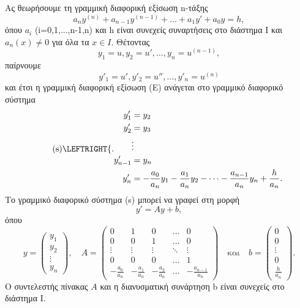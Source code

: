 \documentclass[11pt,a4paper,twoside]{book}
\begin{document}
\medskip
Ας θεωρήσουμε τη γραμμική διαφορική εξίσωση n-τάξης
\begin{equation} \tag{E}
a_n y^{(n)} + a_{n-1} y^{(n-1)} + \dots + a_1 y' + a_0 y = h,
\end{equation}
όπου $a_i$ (i=0,1,...,n-1,n) και h είναι συνεχείς συναρτήσεις στο διάστημα Ι και $a_n(x) \ne 0$ για όλα τα $x \in I$. Θέτοντας
\[
y_1=u, y_2=u', \dots, y_n=u^{(n-1)},
\]
παίρνουμε
\[
y'_1=u', y'_2=u'', \dots, y'_n=u^{(n)}
\]
και έτσι η γραμμική διαφορική εξίσωση (Ε) ανάγεται στο γραμμικό διαφορικό σύστημα
\begin{equation} \tag{s}
\LEFTRIGHT\{.{
\begin{aligned}
    y'_1 &= y_2 \\
    y'_2 &= y_3 \\
    &\vdots \\
    y'_{n-1} &= y_n \\
    y'_n &= -\frac{a_0}{a_n}y_1 - \frac{a_1}{a_n}y_2 - \dots - \frac{a_{n-1}}{a_n}y_n + \frac{h}{a_n}.
\end{aligned}}
\end{equation}
Το γραμμικό διαφορικό σύστημα (s) μπορεί να γραφεί στη μορφή
\begin{equation} \tag{s}
y' = Ay+b,
\end{equation}
όπου
\[
y = \begin{pmatrix} y_1 \\ y_2 \\ \vdots \\ y_n \end{pmatrix}, \quad
A = \begin{pmatrix}
    0 & 1 & 0 & \dots & 0 \\
    0 & 0 & 1 & \dots & 0 \\
    \vdots & \vdots & \vdots & \ddots & \vdots \\
    0 & 0 & 0 & \dots & 1 \\
    -\frac{a_0}{a_n} & -\frac{a_1}{a_n} & -\frac{a_2}{a_n} & \dots & -\frac{a_{n-1}}{a_n}
\end{pmatrix} \quad \text{και} \quad
b = \begin{pmatrix} 0 \\ 0 \\ \vdots \\ 0 \\ \frac{h}{a_n} \end{pmatrix}.
\]
Ο συντελεστής πίνακας $Α$ και η διανυσματική συνάρτηση b είναι συνεχείς στο διάστημα Ι.
\end{document}
